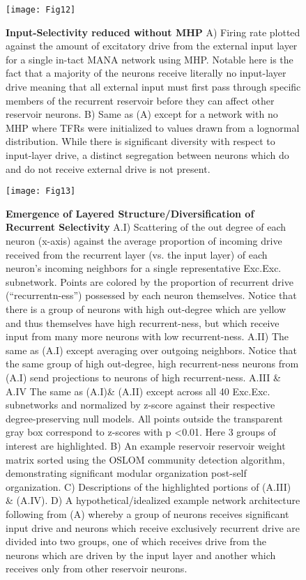 \documentclass[10pt,letterpaper]{article}
\begin{document}
\begin{figure}[!h]
	\centering
	\texttt{[image: Fig12]}
	\caption{{\bf Input-Selectivity reduced without MHP}
		\footnotesize A)  Firing rate plotted against the amount of excitatory drive from the external input layer for a single in-tact MANA network using MHP. Notable here is the fact that a majority of the neurons receive literally no input-layer drive meaning that all external input must first pass through specific members of the recurrent reservoir before they can affect other reservoir neurons. B) Same as (A) except for a network with no MHP where TFRs were initialized to values drawn from a lognormal distribution. While there is significant diversity with respect to input-layer drive, a distinct segregation between neurons which do and do not receive external drive is not present.      }
	\label{Fig12}
\end{figure}

\begin{figure}[!h]
	\centering
	\texttt{[image: Fig13]}
	\caption{{\bf Emergence of Layered Structure/Diversification of Recurrent Selectivity}
		\footnotesize A.I) Scattering of the out degree of each neuron (x-axis) against the average proportion of incoming drive received from the recurrent layer (vs. the input layer) of each neuron's incoming neighbors for a single representative Exc.\textrightarrow Exc. subnetwork. Points are colored by the proportion of recurrent drive (``recurrentn-ess'') possessed by each neuron themselves. Notice that there is a group of neurons with high out-degree which are yellow and thus themselves have high recurrent-ness, but which receive input from many more neurons with low recurrent-ness. A.II) The same as (A.I) except averaging over outgoing neighbors. Notice that the same group of high out-degree, high recurrent-ness neurons from (A.I) send projections to neurons of high recurrent-ness. A.III \& A.IV The same as (A.I)\& (A.II) except across all 40 Exc.\textrightarrow Exc. subnetworks and normalized by z-score against their respective degree-preserving null models. All points outside the transparent gray box correspond to z-scores with p \textless 0.01. Here 3 groups of interest are highlighted. B) An example reservoir \textrightarrow reservoir weight matrix sorted using the OSLOM community detection algorithm\cite{lancichinetti2011finding}, demonstrating significant modular organization post-self organization. C) Descriptions of the highlighted portions of (A.III) \& (A.IV). D) A hypothetical/idealized example network architecture following from (A) whereby a group of neurons receives significant input drive and neurons which receive exclusively recurrent drive are divided into two groups, one of which receives drive from the neurons which are driven by the input layer and another which receives only from other reservoir neurons.   }
	\label{Fig13}
\end{figure}
\end{document}
